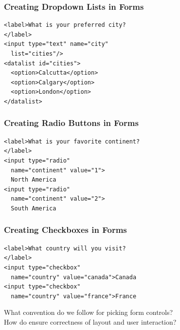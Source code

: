 \documentclass[14pt,aspectratio=169]{beamer}
\begin{document}
%
\begin{frame}[fragile]
  \frametitle{Creating Dropdown Lists in Forms}
  \normalsize
  \begin{minipage}{6in}
    \vspace*{.1in}
    \begin{verbatim}
<label>What is your preferred city?
</label>
<input type="text" name="city"
  list="cities"/>
<datalist id="cities">
  <option>Calcutta</option>
  <option>Calgary</option>
  <option>London</option>
</datalist>
    \end{verbatim}
  \end{minipage}
  \vspace*{.05in}
  \begin{center}
  \end{center}
\end{frame}

%
\begin{frame}[fragile]
  \frametitle{Creating Radio Buttons in Forms}
  \normalsize
  \begin{minipage}{6in}
    \vspace*{.1in}
    \begin{verbatim}
<label>What is your favorite continent?
</label>
<input type="radio"
  name="continent" value="1">
  North America
<input type="radio"
  name="continent" value="2">
  South America
    \end{verbatim}
  \end{minipage}
  \vspace*{.05in}
  \begin{center}
  \end{center}
\end{frame}

%
\begin{frame}[fragile]
  \frametitle{Creating Checkboxes in Forms}
  \normalsize
  \begin{minipage}{6in}
    \vspace*{.1in}
    \begin{verbatim}
<label>What country will you visit?
</label>
<input type="checkbox"
  name="country" value="canada">Canada
<input type="checkbox"
  name="country" value="france">France
    \end{verbatim}
  \end{minipage}
  \vspace*{.05in}
  \begin{center}
    \noindent What convention do we follow for picking form controls? \\
    \noindent How do ensure correctness of layout and user interaction? \\
  \end{center}
\end{frame}
\end{document}
